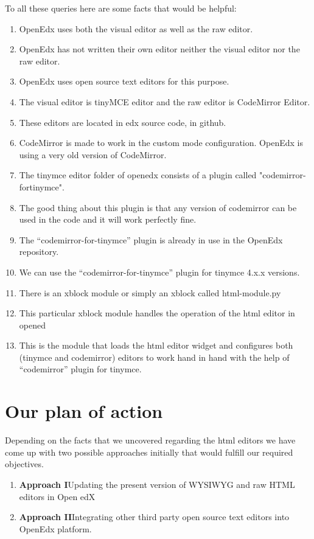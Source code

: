 To all these queries here are some facts that would be helpful:
\begin{enumerate}
\item OpenEdx uses both the visual editor as well as the raw editor.
\item OpenEdx has not written their own editor neither the visual editor nor the raw editor.
\item OpenEdx uses open source text editors for this purpose.
\item The visual editor is tinyMCE editor and the raw editor is CodeMirror Editor.
\item These editors are located in edx source code, in github.
\item CodeMirror is made to work in the custom mode configuration. OpenEdx is using a very old version of CodeMirror.
\item The tinymce editor folder of openedx consists of a plugin called "codemirror-fortinymce".
\item The good thing about this plugin is that any version of codemirror can be used in the code and it will work perfectly fine.
\item The “codemirror-for-tinymce” plugin is already in use in the OpenEdx repository.
\item We can use the “codemirror-for-tinymce” plugin for tinymce 4.x.x versions.
\item There is an xblock module or simply an xblock called html-module.py
\item This particular xblock module handles the operation of the html editor in opened
\item This is the module that loads the html editor widget and configures both (tinymce and codemirror) editors to work hand in hand with the help of “codemirror” plugin for tinymce.
\end{enumerate}


\section{Our plan of action}

Depending on the facts that we uncovered regarding the html editors we have come up with
two possible approaches initially that would fulfill our required objectives.
\begin{enumerate}

\item\textbf{Approach I}\newline Updating the present version of WYSIWYG and raw HTML editors in Open
edX
\item\textbf{Approach II}\newline Integrating other third party open source text editors into OpenEdx platform.
\end{enumerate}

